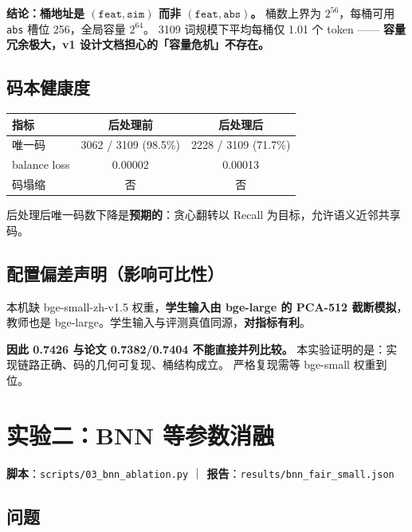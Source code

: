 \documentclass[11pt,a4paper]{ctexart}
\newcommand{\warn}[1]{\textcolor{warnred}{\textbf{#1}}}
\newcommand{\keybox}[1]{%
  \begin{center}\begin{minipage}{0.95\textwidth}%
  \colorbox{graylight}{\begin{minipage}{0.93\textwidth}\vspace{3pt}#1\vspace{3pt}\end{minipage}}%
  \end{minipage}\end{center}}
\begin{document}
\keybox{%
\textbf{结论：桶地址是 $(\texttt{feat},\texttt{sim})$ 而非 $(\texttt{feat},\texttt{abs})$。}
桶数上界为 $2^{56}$，每桶可用 \texttt{abs} 槽位 256，全局容量 $2^{64}$。
3109 词规模下平均每桶仅 1.01 个 token ——
\warn{容量冗余极大，v1 设计文档担心的「容量危机」不存在。}}

\subsection{码本健康度}

\begin{center}
\begin{tabular}{@{}lcc@{}}
\toprule
\textbf{指标} & \textbf{后处理前} & \textbf{后处理后} \\
\midrule
唯一码 & 3062 / 3109 (98.5\%) & 2228 / 3109 (71.7\%) \\
balance loss & 0.00002 & 0.00013 \\
码塌缩 & 否 & 否 \\
\bottomrule
\end{tabular}
\end{center}

后处理后唯一码数下降是\textbf{预期的}：贪心翻转以 Recall 为目标，允许语义近邻共享码。

\subsection{\warn{配置偏差声明（影响可比性）}}

本机缺 bge-small-zh-v1.5 权重，\textbf{学生输入由 bge-large 的 PCA-512 截断模拟}，
教师也是 bge-large。学生输入与评测真值同源，\textbf{对指标有利}。

\warn{因此 0.7426 与论文 0.7382/0.7404 不能直接并列比较。}
本实验证明的是：实现链路正确、码的几何可复现、桶结构成立。
严格复现需等 bge-small 权重到位。

\section{实验二：BNN 等参数消融}

\textbf{脚本}：\texttt{scripts/03\_bnn\_ablation.py} ｜
\textbf{报告}：\texttt{results/bnn\_fair\_small.json}

\subsection{问题}
\end{document}
